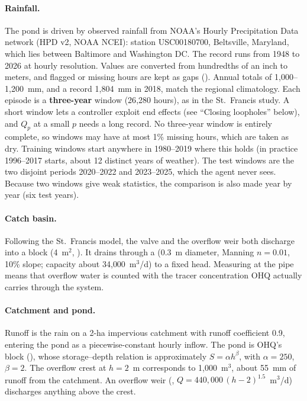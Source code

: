 \paragraph{Rainfall.} The pond is driven by observed rainfall from NOAA's
Hourly Precipitation Data network (HPD v2, NOAA NCEI): station USC00180700,
Beltsville, Maryland, which lies between Baltimore and Washington DC. The
record runs from 1948 to 2026 at hourly resolution. Values are converted from
hundredths of an inch to meters, and flagged or missing hours are kept as
gaps (). Annual totals of 1{,}000--1{,}200~mm, and a
record 1{,}804~mm in 2018, match the regional climatology. Each episode is a
\textbf{three-year} window (26{,}280 hours), as in the St.~Francis study.
A short window lets a controller exploit end effects (see ``Closing
loopholes'' below), and $Q_p$ at a small $p$ needs a long record. No
three-year window is entirely complete, so windows may have at most 1\%
missing hours, which are taken as dry. Training windows start anywhere in
1980--2019 where this holds (in practice 1996--2017 starts, about 12
distinct years of weather). The test windows are the two disjoint periods
2020--2022 and 2023--2025, which the agent never sees. Because two windows
give weak statistics, the comparison is also made year by year (six test
years).

\paragraph{Catch basin.} Following the St.~Francis model, the valve and the
overflow weir both discharge into a  block (4~m$^2$,
). It drains through a  (0.3~m
diameter, Manning $n=0.01$, 10\% slope; capacity about 34{,}000~m$^3$/d) to
a fixed head. Measuring at the pipe means that overflow water is counted
with the tracer concentration OHQ actually carries through the system.

\paragraph{Catchment and pond.} Runoff is the rain on a 2-ha impervious
catchment with runoff coefficient 0.9, entering the pond as a
piecewise-constant hourly inflow. The pond is OHQ's  block
(), whose storage--depth relation is approximately
$S=\alpha h^\beta$, with $\alpha=250$, $\beta=2$. The overflow crest at
$h=2$~m corresponds to 1{,}000~m$^3$, about 55~mm of runoff from the
catchment. An overflow
weir (, $Q=440{,}000\,(h-2)^{1.5}$~m$^3$/d) discharges anything
above the crest.

